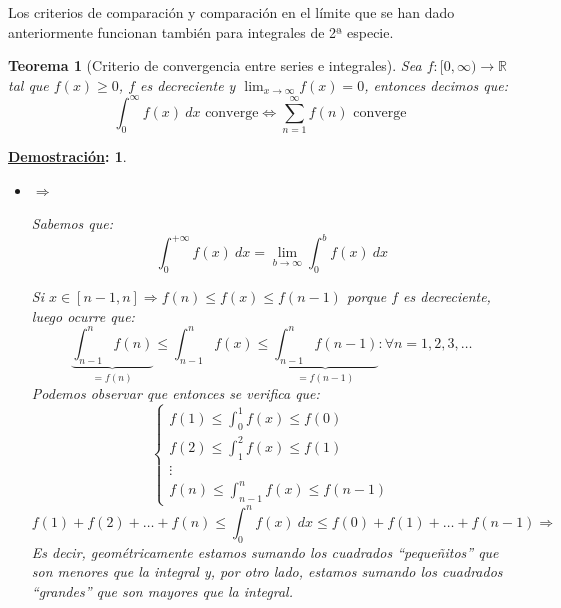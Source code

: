 \documentclass[10pt,a4paper,openright]{book}
\theoremstyle{break}
\newtheorem*{theo}{Teorema}
\newtheorem*{demo}{\underline{Demostración}:}
\newcommand{\dif}[1]{\ d#1}
\begin{document}
Los criterios de comparación y comparación en el límite que se han dado anteriormente funcionan también para integrales de 2ª especie.

\begin{theo}[Criterio de convergencia entre series e integrales]
Sea $f:[0, \infty)\rightarrow \mathbb R$ tal que $f(x)\geq 0$, $f$ es decreciente y $\lim_{x \rightarrow \infty} f(x) = 0$, entonces decimos que:
$$\int_{0}^{\infty} f(x)\dif{x} \mbox{ converge} \Leftrightarrow \sum_{n = 1 }^{\infty} f(n)\mbox{ converge}$$
\end{theo}
\begin{demo}
\begin{itemize}
\item $\Rightarrow$

Sabemos que:
$$ \int_{0}^{+\infty} f(x)\dif{x} = \lim_{b \to \infty} \int_{0}^{b} f(x)\dif{x}$$

Si $x \in [n-1, n] \Rightarrow f(n) \leq f(x) \leq f(n-1)$ porque $f$ es decreciente, luego ocurre que:
$$\underbrace{\int_{n-1}^{n} f(n)}_{ = f(n)} \leq \int_{n-1}^{n} f(x) \leq \underbrace{\int_{n-1}^{n} f(n-1)}_{ = f(n-1)} : \forall n=1,2,3,\ldots$$
Podemos observar que entonces se verifica que:
$$\begin{cases} \displaystyle f(1) \leq  \int_{0}^{1} f(x) \leq f(0)\\ \displaystyle f(2) \leq  \int_{1}^{2} f(x) \leq f(1) \\ \displaystyle \vdots \\ \displaystyle f(n) \leq  \int_{n-1}^{n} f(x) \leq f(n-1)\end{cases}$$
$$ f(1) + f(2) + \ldots + f(n) \leq \int_{0}^{n} f(x)\dif{x} \leq f(0)+f(1) + \ldots + f(n-1)\Rightarrow$$
Es decir, geométricamente estamos sumando los cuadrados ``pequeñitos'' que son menores que la integral y, por otro lado, estamos sumando los cuadrados ``grandes'' que son mayores que la integral.

\end{itemize}
\end{demo}
\end{document}
